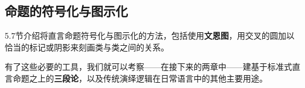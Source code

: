 \subsection{命题的符号化与图示化}
5.7节介绍将直言命题符号化与图示化的方法，包括使用\textbf{文恩图}，用交叉的圆加以恰当的标记或阴影来刻画类与类之间的关系。

\begin{center}
\end{center}

有了这些必要的工具，我们就可以考察——在接下来的两章中——建基于标准式直言命题之上的\textbf{三段论}，以及传统演绎逻辑在日常语言中的其他主要用途。 